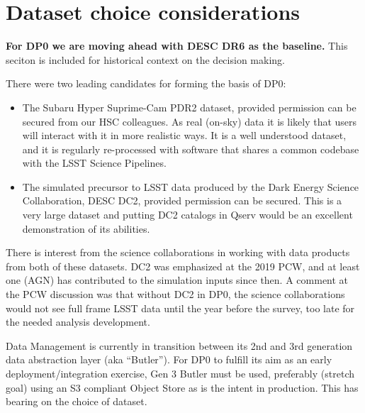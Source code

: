 
\section {Dataset choice considerations} \label{sec:dataset}

{\bf For DP0 we are moving ahead with DESC DR6 as the baseline.}
This seciton is included for historical context on the decision making.

 There were  two leading candidates for forming the basis of DP0:

\begin{itemize}

\item The Subaru Hyper Suprime-Cam PDR2 dataset, provided permission can be secured from our HSC colleagues. As real (on-sky) data it is likely that users will interact with it in more realistic ways. It is a well understood dataset, and it is regularly re-processed with software that shares a common codebase with the LSST Science Pipelines.

\item The simulated precursor to LSST data produced by the Dark Energy Science Collaboration, DESC DC2, provided permission can be secured. This is a very large dataset and putting DC2 catalogs in Qserv would be an excellent demonstration of its abilities.

\end{itemize}

There is interest from the science collaborations in working with data products from both of these datasets. DC2 was emphasized at the 2019 PCW, and at least one (AGN) has contributed to the simulation inputs since then. A comment at the PCW discussion was that without DC2 in DP0, the science collaborations would not see full frame LSST data until the year before the survey, too late for the needed analysis development.

Data Management is currently in transition between its 2nd and 3rd generation data abstraction layer (aka ``Butler''). For DP0 to fulfill its aim as an early deployment/integration exercise, Gen 3 Butler must be used, preferably (stretch goal) using an S3 compliant Object Store as is the intent in production. This has bearing on the choice of dataset.

